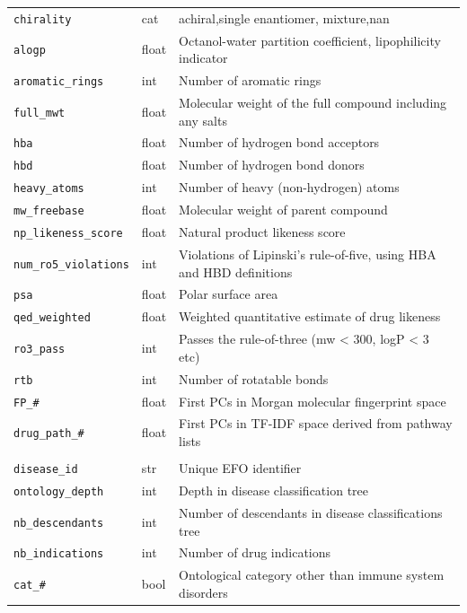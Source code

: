\begin{table}[H]
\begin{tabular}{p{4cm}p{2cm}p{9cm}}
        \texttt{chirality} & cat & achiral,single enantiomer, mixture,nan \\
        \texttt{alogp} & float & Octanol-water partition coefficient, lipophilicity indicator\\
        \texttt{aromatic\_rings} & int & Number of aromatic rings\\
        \texttt{full\_mwt} & float & Molecular weight of the full compound including any salts\\
        \texttt{hba} & float & Number of hydrogen bond acceptors\\
        \texttt{hbd} & float & 	Number of hydrogen bond donors\\
        \texttt{heavy\_atoms} & int & Number of heavy (non-hydrogen) atoms\\
        \texttt{mw\_freebase} & float & Molecular weight of parent compound\\
        \texttt{np\_likeness\_score} & float & Natural product likeness score~\cite{ertl2008}\\
        \texttt{num\_ro5\_violations} & int & Violations of Lipinski's rule-of-five, using HBA and HBD definitions\\
        \texttt{psa} & float & Polar surface area\\
        \texttt{qed\_weighted} & float & Weighted quantitative estimate of drug likeness~\cite{bickerton2012}\\
        \texttt{ro3\_pass} & int & Passes the rule-of-three (mw < 300, logP < 3 etc)\\
        \texttt{rtb} & int & Number of rotatable bonds\\
        \texttt{FP\_\#} & float& First PCs in Morgan molecular fingerprint space \\
        \texttt{drug\_path\_\#} & float & First PCs in TF-IDF space derived from pathway lists\\
        \midrule
        \rowcolor{white}
        \multicolumn{2}{l}{\textbf{Disease}} \\
        \midrule
        \texttt{disease\_id} & str & Unique EFO identifier\\
        \texttt{ontology\_depth} & int & Depth in disease classification tree\\
        \texttt{nb\_descendants} & int & Number of descendants in disease classifications tree\\
        \texttt{nb\_indications} & int & Number of drug indications\\
        \texttt{cat\_\#} & bool & Ontological category other than immune system disorders\\

\end{tabular}
\end{table}
